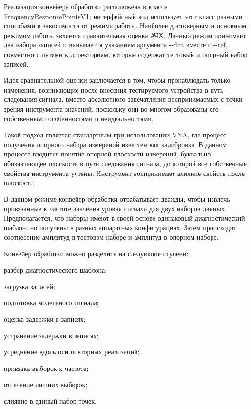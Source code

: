 \documentclass{report}
\begin{document}
Реализация конвейера обработки расположена в классе FrequencyResponsePointsV1; интерфейсный код использует этот класс разными способами в зависимости от режима работы.
Наиболее достоверным и основным режимом работы является сравнительная оценка АЧХ. Данный режим принимает два набора записей и вызывается указанием аргумента -{}-dut вместе с -{}-ref, совместно с путями к директориям, которые содержат тестовый и опорный набор записей.

Идея сравнительной оценки заключается в том, чтобы пронаблюдать только изменения, возникающие после внесения тестируемого устройства в путь следования сигнала, вместо абсолютного запечатления воспринимаемых с точки зрения инструмента значений, поскольку они во многом образованы его собственными особенностями и неидеальностями.

Такой подход является стандартным при использовании VNA, где процесс получения опорного набора измерений известен как калибровка. В данном процессе вводится понятие опорной плоскости измерений, буквально обозначающее плоскость в пути следования сигнала, до которой все собственные свойства инструмента учтены. Инструмент воспринимает влияние свойств после плоскости.

В данном режиме конвейер обработки отрабатывает дважды, чтобы извлечь привязанные к частоте значения уровня сигнала для двух наборов данных. Предполагается, что наборы имеют в своей основе одинаковый диагностический шаблон, но получены в разных аппаратных конфигурациях. Затем происходит соотнесение амплитуд в тестовом наборе и амплитуд в опорном наборе.

Конвейер обработки можно разделить на следующие ступени:

\begin{enummarker}
    \item разбор диагностического шаблона;
    \item загрузка записей;
    \item подготовка модельного сигнала;
    \item оценка задержки в записях;
    \item устранение задержки в записях;
    \item усреднение вдоль оси повторных реализаций;
    \item привязка выборок к частоте;
    \item отсечение лишних выборок;
    \item слияние в единый набор точек.
\end{enummarker}
\end{document}

